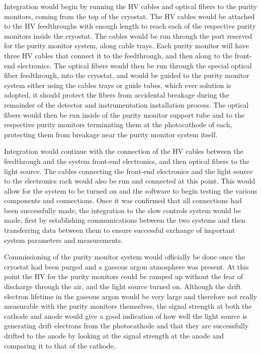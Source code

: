 Integration would begin by running the HV cables and optical fibers to the purity monitors, coming from the top of the cryostat.  The HV cables would be attached to the HV feedthroughs with enough length to reach each of the respective purity monitors inside the cryostat.  
The cables would be run through the port reserved for the purity monitor system, along cable trays. 
Each purity monitor will have three HV cables that connect it to the feedthrough, and then along to the front-end electronics.  The optical fibers would then be run through the special optical fiber feedthrough, into the cryostat, and would be guided to the purity monitor system either using the cables trays or guide tubes,
which ever solution is adopted, 
it should protect the fibers from accidental breakage during the remainder of the detector and instrumentation installation process.  The optical fibers would then be run inside of the purity monitor support tube and to the respective purity monitors terminating them at the photocathode of each, protecting them from breakage near the purity monitor system itself.

Integration would continue with the connection of the HV cables between the feedthrough and the system front-end electronics, and then optical fibers to the light source.  The cables connecting the front-end electronics and the light source to the electronics rack would also be run and connected at this point.  This would allow for the system to be turned on and the software to begin testing the various components and connections.  Once it was confirmed that all connections had been successfully made, the integration to the slow controls system would be made, first by establishing communications between the two systems and then transferring data between them to ensure successful exchange of important system parameters and measurements.  

Commissioning of the purity monitor system would officially be done once the cryostat had been purged and a gaseous argon atmosphere was present.  At this point the HV for the purity monitors could be ramped up without the fear of discharge through the air, and the light source turned on.  Although the drift electron lifetime in the gaseous argon would be very large and therefore not really measurable with the purity monitors themselves, the signal strength at both the cathode and anode would give a good indication of how well the light source is generating drift electrons from the photocathode and that they are successfully drifted to the anode by looking at the signal strength at the anode and comparing it to that of the cathode.

